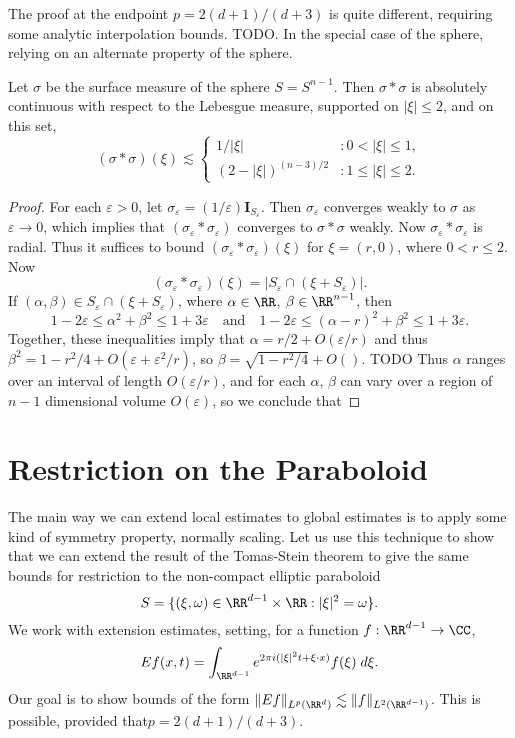The proof at the endpoint $p = 2(d+1)/(d+3)$ is quite different, requiring some analytic interpolation bounds. TODO. In the special case of the sphere, relying on an alternate property of the sphere.

\begin{lemma}
  Let $\sigma$ be the surface measure of the sphere $S = S^{n-1}$. Then $\sigma * \sigma$ is absolutely continuous with respect to the Lebesgue measure, supported on $|\xi| \leq 2$, and on this set,
  \[ (\sigma * \sigma)(\xi) \lesssim \begin{cases} 1/|\xi| &: 0 < |\xi| \leq 1, \\ (2 - |\xi|)^{(n-3)/2} &: 1 \leq |\xi| \leq 2. \end{cases} \]
\end{lemma}
\begin{proof}
  For each $\varepsilon > 0$, let $\sigma_\varepsilon = (1/\varepsilon) \mathbf{I}_{S_\varepsilon}$. Then $\sigma_\varepsilon$ converges weakly to $\sigma$ as $\varepsilon \to 0$, which implies that $(\sigma_\varepsilon * \sigma_\varepsilon)$ converges to $\sigma * \sigma$ weakly. Now $\sigma_\varepsilon * \sigma_\varepsilon$ is radial. Thus it suffices to bound $(\sigma_\varepsilon * \sigma_\varepsilon)(\xi)$ for $\xi = (r,0)$, where $0 < r \leq 2$. Now
  \[ (\sigma_\varepsilon * \sigma_\varepsilon)(\xi) = |S_\varepsilon \cap (\xi + S_\varepsilon)|. \]
  If $(\alpha,\beta) \in S_\varepsilon \cap (\xi + S_\varepsilon)$, where $\alpha \in \RR$, $\beta \in \RR^{n-1}$, then
  \[ 1 - 2\varepsilon \leq \alpha^2 + \beta^2 \leq 1 + 3\varepsilon\quad\text{and}\quad 1 - 2\varepsilon \leq (\alpha - r)^2 + \beta^2 \leq 1 + 3\varepsilon. \]
  Together, these inequalities imply that $\alpha = r/2 + O(\varepsilon/r)$ and thus $\beta^2 = 1 - r^2/4 + O(\varepsilon + \varepsilon^2/r)$, so $\beta = \sqrt{1 - r^2/4} + O()$. TODO Thus $\alpha$ ranges over an interval of length $O(\varepsilon/r)$, and for each $\alpha$, $\beta$ can vary over a region of $n-1$ dimensional volume $O(\varepsilon)$, so we conclude that
\end{proof}

\section{Restriction on the Paraboloid}

The main way we can extend local estimates to global estimates is to apply some kind of symmetry property, normally scaling. Let us use this technique to show that we can extend the result of the Tomas-Stein theorem to give the same bounds for restriction to the non-compact elliptic paraboloid
%
\[ S = \{ (\xi,\omega) \in \RR^{d-1} \times \RR: |\xi|^2 = \omega \}. \]
%
We work with extension estimates, setting, for a function $f: \RR^{d-1} \to \CC$,
%
\[ Ef(x,t) = \int_{\RR^{d-1}} e^{2 \pi i (|\xi|^2 t + \xi \cdot x)} f(\xi)\; d\xi. \]
%
Our goal is to show bounds of the form $\| Ef \|_{L^p(\RR^d)} \lesssim \| f \|_{L^2(\RR^{d-1})}$. This is possible, provided that$p = 2(d+1)/(d+3)$.

